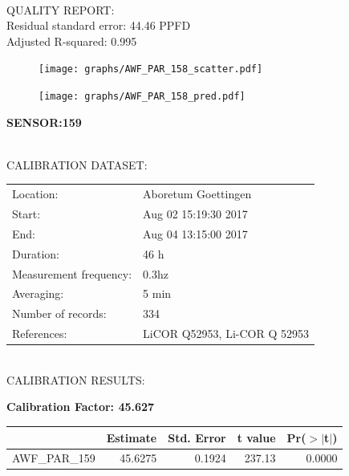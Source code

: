 \documentclass[oneside]{report}
\begin{document}
\hrulefill\\
QUALITY REPORT:\\
Residual standard error: 44.46 PPFD\\
Adjusted R-squared: 0.995



\begin{figure}[H]
  \centering
  \texttt{[image: graphs/AWF\_PAR\_158\_scatter.pdf]}
\end{figure}




\begin{figure}[H]
  \centering
  \texttt{[image: graphs/AWF\_PAR\_158\_pred.pdf]}
\end{figure}

\pagebreak


\begin{center}
\large{\textbf{SENSOR:159}}\\
\end{center}

\hrulefill\\
CALIBRATION DATASET:\\
\begin{table}[h!]
  \centering
  \label{tab:table1}
  \begin{tabular}{ll}
    Location: & Aboretum Goettingen\\ 
    
    
    Start:  & Aug 02 15:19:30 2017 \\
    End:   & Aug 04 13:15:00 2017\\ 
    Duration: & 46 h\\
    Measurement frequency: & 0.3hz\\
    Averaging:  &5 min\\
    Number of records: & 334 \\
    References: & LiCOR Q52953, Li-COR Q 52953 \\
  \end{tabular}
\end{table}

\hrulefill\\
CALIBRATION RESULTS:\\


\begin{center}
\textbf{\large{Calibration Factor: 45.627}}\\
\end{center}
\begin{table}[ht]
\centering
\begin{tabular}{rrrrr}
  \hline
 & Estimate & Std. Error & t value & Pr($>$$|$t$|$) \\ 
  \hline
AWF\_PAR\_159 & 45.6275 & 0.1924 & 237.13 & 0.0000 \\ 
   \hline
\end{tabular}
\end{table}
\end{document}
